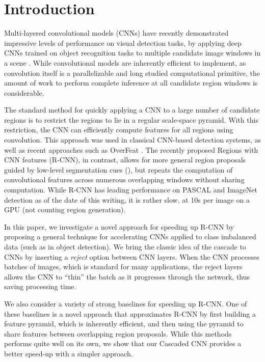 \section{Introduction}\label{introduction}

Multi-layered convolutional models (CNNs) have recently demonstrated impressive levels of performance on visual detection tasks, by applying deep CNNs trained on object recognition tasks to multiple candidate image windows in a scene \cite{Sermanet-ICLR-2014,Girshick-CVPR-2014}.
While convolutional models are inherently efficient to implement, as convolution itself is a parallelizable and long studied computational primitive, the amount of work to perform complete inference at all candidate region windows is considerable.

The standard method for quickly applying a CNN to a large number of candidate regions is to restrict the regions to lie in a regular scale-space pyramid.
With this restriction, the CNN can efficiently compute features for all regions using convolution.
This approach was used in classical CNN-based detection systems, as well as recent approaches such as OverFeat \cite{Sermanet-ICLR-2014}.
The recently proposed Regions with CNN features (R-CNN), in contrast, allows for more general region proposals guided by low-level segmentation cues (\cite{Uijlings-IJCV-2013}), but repeats the computation of convolutional features across numerous overlapping windows without sharing computation.
While R-CNN has leading performance on PASCAL and ImageNet detection as of the date of this writing, it is rather slow, at 10s per image on a GPU (not counting region generation).

In this paper, we investigate a novel approach for speeding up R-CNN by proposing a general technique for accelerating CNNs applied to class imbalanced data (such as in object detection).
We bring the classic idea of the cascade to CNNs by inserting a \emph{reject} option between CNN layers.
When the CNN processes batches of images, which is standard for many applications, the reject layers allows the CNN to ``thin'' the batch as it progresses through the network, thus saving processing time.

We also consider a variety of strong baselines for speeding up R-CNN.
One of these baselines is a novel approach that approximates R-CNN by first building a feature pyramid, which is inherently efficient, and then using the pyramid to share features between overlapping region proposals.
While this methods performs quite well on its own, we show that our Cascaded CNN provides a better speed-up with a simpler approach.

